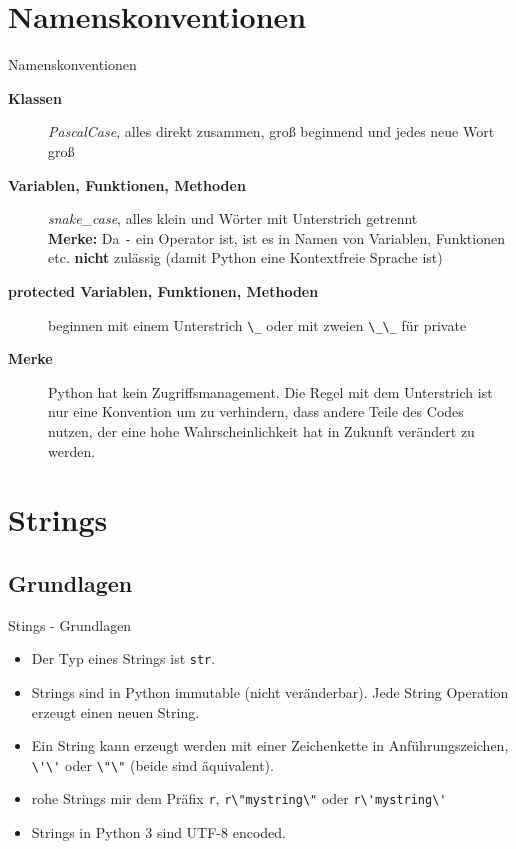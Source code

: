 \documentclass[]{tudbeamer}
\newcommand{\codeline}[1]{\colorbox{codegray}{\lstinline{#1}}}
\begin{document}
\section{Namenskonventionen}
\begin{frame}[fragile]{Namenskonventionen}
	\begin{description}
	    \item[\textbf{Klassen}] \textit{PascalCase}, alles direkt zusammen, gro\ss{} beginnend und jedes neue Wort gro\ss{}
	    \item[\textbf{Variablen, Funktionen, Methoden}] \textit{snake\_case}, alles klein und Wörter mit Unterstrich getrennt \\
	    \textbf{Merke:} Da \codeline{-} ein Operator ist, ist es in Namen von Variablen, Funktionen etc. \textbf{nicht} zulässig (damit Python eine Kontextfreie Sprache ist)
	    \item[\textbf{protected Variablen, Funktionen, Methoden}] beginnen mit einem Unterstrich \codeline{\_} oder mit zweien \codeline{\_\_} für private
	    \item[\textbf{Merke}] Python hat kein Zugriffsmanagement. Die Regel mit dem Unterstrich ist nur eine Konvention um zu verhindern, dass andere Teile des Codes nutzen, der eine hohe Wahrscheinlichkeit hat in Zukunft verändert zu werden.
	\end{description}
\end{frame}


\section{Strings}
\subsection{Grundlagen}
\begin{frame}[fragile]{Stings - Grundlagen}
	\begin{itemize}
	    \item Der Typ eines Strings ist \codeline{str}.
	    \item Strings sind in Python immutable (nicht veränderbar). Jede String Operation erzeugt einen neuen String.
	    \item Ein String kann erzeugt werden mit einer Zeichenkette in Anführungszeichen, \codeline{\'\'} oder \codeline{\"\"} (beide sind äquivalent).
	    \item rohe Strings mir dem Präfix \codeline{r}, \codeline{r\"mystring\"} oder \codeline{r\'mystring\'}
	    \item Strings in Python 3 sind UTF-8 encoded.
	\end{itemize}
\end{frame}
\end{document}
